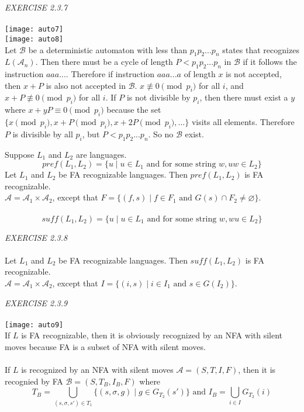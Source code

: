 \documentclass{article}
\begin{document}
\begin{siderules}\color{blue}\textit{EXERCISE 2.3.7}\color{black}\\\\
\texttt{[image: auto7]}\\
\texttt{[image: auto8]}\\
Let \(\mathcal{B}\) be a deterministic automaton with less than \(p_{1}p_{2}...p_{n}\) states that recognizes \(L(\mathcal{A}_{n})\). Then there must be a cycle of length \(P<p_{1}p_{2}...p_{n}\) in \(\mathcal{B}\) if it follows the instruction \(aaa...\).
Therefore if instruction \(aaa...a\) of length \(x\) is not accepted, then \(x+P\) is also not accepted in \(\mathcal{B}\).
\(x\not\equiv 0\pmod{p_{i}}\) for all \(i\), and \(x+P\not\equiv 0\pmod{p_{i}}\) for all \(i\). If \(P\) is not divisible by \(p_{i}\), then there must exist a \(y\) where \(x+yP\equiv 0\pmod{p_{i}}\) because 
the set \(\{x\pmod{p_{i}},x+P\pmod{p_{i}},x+2P\pmod{p_{i}},...\}\) visits all elements. Therefore \(P\) is divisible by all \(p_{i}\), but \(P<p_{1}p_{2}...p_{n}\).
So no \(\mathcal{B}\) exist.
\end{siderules}
Suppose \(L_{1}\) and \(L_{2}\) are languages.
\[pref(L_{1},L_{2})=\{u\;|\;u\in L_{1} \text{ and for some string }w,uw\in L_{2}\}\]
\color{red}Let \(L_{1}\) and \(L_{2}\) be FA recognizable languages. Then \(pref(L_{1},L_{2})\) is FA recognizable.\\\color{black}
\(\mathcal{A}=\mathcal{A}_{1}\times \mathcal{A}_{2}\), except that \(F=\{(f,s)\;|\; f\in F_{1}\text{ and }G(s)\cap F_{2}\neq\varnothing\}\).\\\\
\[suff(L_{1},L_{2})=\{u\;|\;u\in L_{1} \text{ and for some string }w,wu\in L_{2}\}\]
\begin{siderules}\color{blue}\textit{EXERCISE 2.3.8}\color{black}\\\\
\color{red}Let \(L_{1}\) and \(L_{2}\) be FA recognizable languages. Then \(suff(L_{1},L_{2})\) is FA recognizable.\\\color{black}
\(\mathcal{A}=\mathcal{A}_{1}\times \mathcal{A}_{2}\), except that \(I=\{(i,s)\;|\;i\in I_{1}\text{ and }s\in G(I_{2})\}\).
\end{siderules}
\begin{siderules}\color{blue}\textit{EXERCISE 2.3.9}\color{black}\\\\
\texttt{[image: auto9]}\\
If \(L\) is FA recognizable, then it is obviously recognized by an NFA with silent moves because FA is a subset of NFA with silent moves.\\\\
If \(L\) is recognized by an NFA with silent moves \(\mathcal{A}=(S,T,I,F)\), then it is recognied by FA \(\mathcal{B}=(S,T_{B},I_{B},F)\) where 
\[T_{B}=\bigcup_{(s,\sigma,s')\in T_{1}}\{(s,\sigma,g)\;|\; g\in G_{T_{2}}(s')\}\text{ and }I_{B}=\bigcup_{i\in I}G_{T_{2}}(i)\]
\end{siderules}
\end{document}
